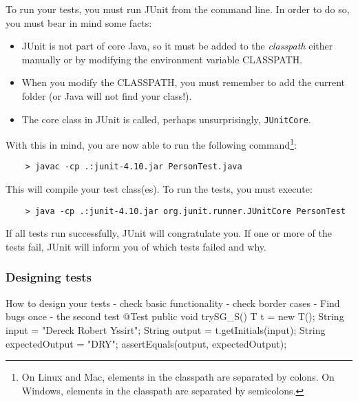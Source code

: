 To run your tests, you must run JUnit from the command line. In order
to do so, you must bear in mind some facts: 

\begin{itemize}
\item JUnit is not part of core Java, so it must be added to the
  \emph{classpath} either manually or by modifying the environment
  variable CLASSPATH.
\item When you modify the CLASSPATH, you must remember to add the
  current folder (or Java will not find your class!).
\item The core class in JUnit is called, perhaps unsurprisingly,
  \verb+JUnitCore+. 
\end{itemize}

With this in mind, you are now able to run the following
command\footnote{On Linux and Mac, elements in the classpath are
  separated by colons. On Windows, elements in the classpath are
  separated by semicolons.}: 

\begin{verbatim}
    > javac -cp .:junit-4.10.jar PersonTest.java
\end{verbatim}

This will compile your test class(es). To run the tests, you must
execute: 

\begin{verbatim}
    > java -cp .:junit-4.10.jar org.junit.runner.JUnitCore PersonTest
\end{verbatim}

If all tests run successfully, JUnit will congratulate you. If one or
more of the tests fail, JUnit will inform you of which tests failed
and why. 


\subsubsection{Designing tests}
\label{sec:designing-tests}


How to design your tests
  - check basic functionality
  - check border cases
  - Find bugs once
    - the second test
 @Test
   public void trySG_S()
     {
        T t = new T();
        String input = "Dereck Robert  Yssirt";
        String output = t.getInitials(input);
        String expectedOutput = "DRY";
        assertEquals(output, expectedOutput);
     }


